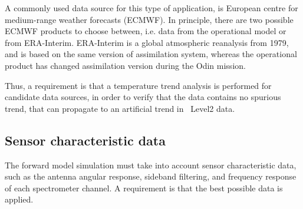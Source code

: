 A commonly used data source for this type of application, is
European centre for medium-range weather forecasts (ECMWF).
In principle, there are two possible ECMWF products to choose
between, i.e. data from the operational model or from   
ERA-Interim. ERA-Interim is a global atmospheric reanalysis from 1979,
and is based on the same version of assimilation system,
whereas the operational product has changed assimilation
version during the Odin mission. 
 
Thus, a requirement is that a temperature trend analysis is performed
for candidate data sources, in order to verify that the data contains
no spurious trend, that can propagate to an artificial trend in
\smr\ Level2 data.
 

\subsection{Sensor characteristic data}  
The forward model simulation must take into account sensor characteristic data,
such as the antenna angular response, sideband filtering, and frequency response 
of each spectrometer channel. A requirement is that the best possible
data is applied. 



